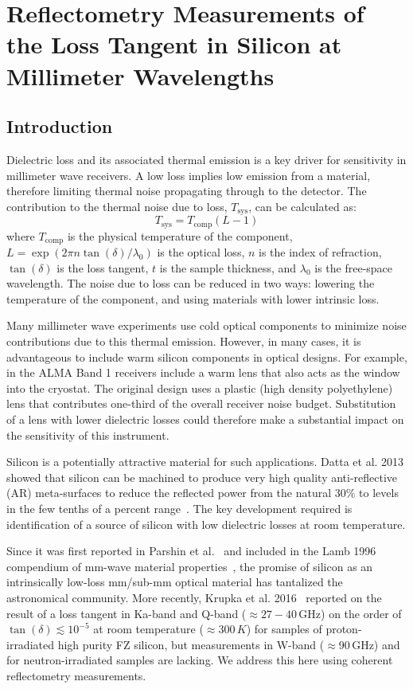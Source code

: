 \chapter{Reflectometry Measurements of the Loss Tangent in Silicon at Millimeter Wavelengths}
\label{ch:si}
\section{Introduction}
Dielectric loss and its associated thermal emission is a key driver for sensitivity in millimeter wave receivers. A low loss implies low emission from a material, therefore limiting thermal noise propagating through to the detector. The
contribution to the thermal noise due to loss,  $T_{\text{sys}}$, can be calculated as:
\begin{equation}
    T_{\text{sys}}=T_{\text{comp}}(L-1)
\end{equation}
where $T_{\text{comp}}$ is the physical temperature of the component, $L=\exp(2\pi n \tan(\delta)/\lambda_0)$ is the optical loss, $n$ is the index of refraction, $\tan(\delta)$ is the loss tangent, $t$ is the sample thickness, and $\lambda_0$ is the free-space wavelength. The noise due to loss can be reduced in two ways: lowering the temperature of the component, and using materials with lower intrinsic loss. 

Many millimeter wave experiments use cold optical components to minimize noise contributions due to this thermal
emission. However, in many cases, it is advantageous to include warm silicon components in optical designs. For example,
in the ALMA Band 1 receivers include a warm lens that also acts as the window into the cryostat. The original design
uses a plastic (high density polyethylene) lens that contributes one-third of the overall receiver noise budget. Substitution of a lens with lower dielectric losses could therefore make a substantial impact on the sensitivity of this instrument.

Silicon is a potentially attractive material for such applications. Datta et al. 2013 showed that silicon can be machined to produce very high quality anti-reflective (AR) meta-surfaces to reduce the reflected power from the natural 30\% to levels in the few tenths of a percent range~\cite{Datta:13}. The key development required is identification of a source of silicon with low dielectric losses at room temperature.

Since it was first reported in Parshin et al.~\cite{parshin} and included in the Lamb 1996 compendium of mm-wave material properties~\cite{lamb}, the promise of silicon as an intrinsically low-loss mm/sub-mm optical material has tantalized the astronomical community.   More recently, Krupka et al. 2016~\cite{KRUPKA201676} reported on the result of a loss tangent in Ka-band and Q-band ($\approx27-40$\,GHz) on the order of $\tan(\delta)\lesssim 10^{-5}$ at room temperature ($\approx300\,K$) for samples of proton-irradiated high purity FZ silicon, but measurements in W-band ($\approx$90\,GHz) and for neutron-irradiated samples are lacking. We address this here using coherent reflectometry measurements.

